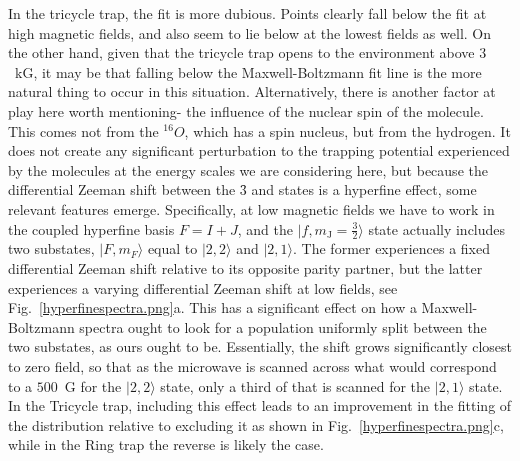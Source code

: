 In the tricycle trap, the fit is more dubious. 
Points clearly fall below the fit at high magnetic fields, and also seem to lie below at the lowest fields as well.
On the other hand, given that the tricycle trap opens to the environment above $3$~kG, it may be that falling below the Maxwell-Boltzmann fit line is the more natural thing to occur in this situation.
Alternatively, there is another factor at play here worth mentioning- the influence of the nuclear spin of the molecule. 
This comes not from the $^16O$, which has a spin nucleus, but from the hydrogen.
It does not create any significant perturbation to the trapping potential experienced by the molecules at the energy scales we are considering here, but because the differential Zeeman shift between the \f3 and  states is a hyperfine effect, some relevant features emerge.
Specifically, at low magnetic fields we have to work in the coupled hyperfine basis $F=I+J$, and the $|f,m_\text{J}=\frac{3}{2}\rangle$ state actually includes two substates, $|F,m_F\rangle$ equal to $|2,2\rangle$ and $|2,1\rangle$.
The former experiences a fixed differential Zeeman shift relative to its opposite parity partner, but the latter experiences a varying differential Zeeman shift at low fields, see Fig.~\ref{hyperfinespectra.png}a.
This has a significant effect on how a Maxwell-Boltzmann spectra ought to look for a population uniformly split between the two substates, as ours ought to be.
Essentially, the shift grows significantly closest to zero field, so that as the microwave is  scanned across what would correspond to a $500$~G for the $|2,2\rangle$ state, only a third of that is scanned for the $|2,1\rangle$ state.
In the Tricycle trap, including this effect leads to an improvement in the fitting of the distribution relative to excluding it as shown in Fig.~\ref{hyperfinespectra.png}c, while in the Ring trap the reverse is likely the case.


